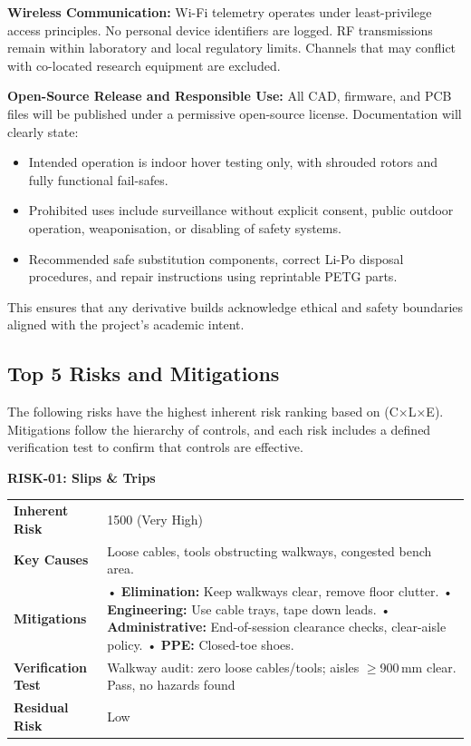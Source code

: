 \vspace{0.5em}
\textbf{Wireless Communication:}  
Wi-Fi telemetry operates under least-privilege access principles. No personal device identifiers are logged. RF transmissions remain within laboratory and local regulatory limits. Channels that may conflict with co-located research equipment are excluded.

\vspace{0.5em}
\textbf{Open-Source Release and Responsible Use:}  
All CAD, firmware, and PCB files will be published under a permissive open-source license. Documentation will clearly state:

\begin{itemize}
    \item Intended operation is indoor hover testing only, with shrouded rotors and fully functional fail-safes.
    \item Prohibited uses include surveillance without explicit consent, public outdoor operation, weaponisation, or disabling of safety systems.
    \item Recommended safe substitution components, correct Li-Po disposal procedures, and repair instructions using reprintable PETG parts.
\end{itemize}

This ensures that any derivative builds acknowledge ethical and safety boundaries aligned with the project's academic intent.

\pagebreak
\subsection{Top 5 Risks and Mitigations}

The following risks have the highest inherent risk ranking based on (C×L×E). Mitigations follow the hierarchy of controls, and each risk includes a defined verification test to confirm that controls are effective.

\textbf{RISK-01: Slips \& Trips}

\begin{tabular}{@{}p{3cm}p{13cm}@{}}
\toprule
\textbf{Inherent Risk} & 1500 (Very High) \\
\textbf{Key Causes} & Loose cables, tools obstructing walkways, congested bench area. \\
\textbf{Mitigations} &
• \textbf{Elimination:} Keep walkways clear, remove floor clutter. \newline
• \textbf{Engineering:} Use cable trays, tape down leads. \newline
• \textbf{Administrative:} End-of-session clearance checks, clear-aisle policy. \newline
• \textbf{PPE:} Closed-toe shoes. \\
\textbf{Verification Test} & Walkway audit: zero loose cables/tools; aisles $\geq$900\,mm clear. Pass, no hazards found \\
\textbf{Residual Risk} & Low \\
\bottomrule
\end{tabular}
\vspace{0.6em}

